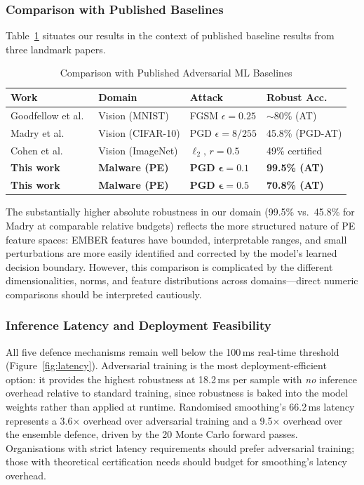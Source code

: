 \documentclass[conference]{IEEEtran}
\begin{document}
\subsubsection{Comparison with Published Baselines}

Table~\ref{tab:baselines} situates our results in the context of published baseline results from three landmark papers.

\begin{table}[htbp]
\centering
\caption{Comparison with Published Adversarial ML Baselines}
\label{tab:baselines}
\setlength{\tabcolsep}{4pt}
\begin{tabular}{p{2.8cm}p{1.3cm}p{1.3cm}p{2.0cm}}
\toprule
\textbf{Work} & \textbf{Domain} & \textbf{Attack} & \textbf{Robust Acc.} \\
\midrule
Goodfellow et al.\ \cite{goodfellow2015} & Vision (MNIST) & FGSM $\epsilon{=}0.25$ & $\sim$80\% (AT) \\
Madry et al.\ \cite{madry2018} & Vision (CIFAR-10) & PGD $\epsilon{=}8/255$ & 45.8\% (PGD-AT) \\
Cohen et al.\ \cite{cohen2019} & Vision (ImageNet) & $\ell_2,\, r{=}0.5$ & 49\% certified \\
\textbf{This work} & \textbf{Malware (PE)} & \textbf{PGD} $\boldsymbol{\epsilon=0.1}$ & \textbf{99.5\% (AT)} \\
\textbf{This work} & \textbf{Malware (PE)} & \textbf{PGD} $\boldsymbol{\epsilon=0.5}$ & \textbf{70.8\% (AT)} \\
\bottomrule
\end{tabular}
\end{table}

The substantially higher absolute robustness in our domain (99.5\% vs.\ 45.8\% for Madry at comparable relative budgets) reflects the more structured nature of PE feature spaces: EMBER features have bounded, interpretable ranges, and small perturbations are more easily identified and corrected by the model's learned decision boundary. However, this comparison is complicated by the different dimensionalities, norms, and feature distributions across domains---direct numeric comparisons should be interpreted cautiously.

\subsubsection{Inference Latency and Deployment Feasibility}

All five defence mechanisms remain well below the 100\,ms real-time threshold (Figure~\ref{fig:latency}). Adversarial training is the most deployment-efficient option: it provides the highest robustness at 18.2\,ms per sample with \emph{no} inference overhead relative to standard training, since robustness is baked into the model weights rather than applied at runtime. Randomised smoothing's 66.2\,ms latency represents a 3.6$\times$ overhead over adversarial training and a 9.5$\times$ overhead over the ensemble defence, driven by the 20 Monte Carlo forward passes. Organisations with strict latency requirements should prefer adversarial training; those with theoretical certification needs should budget for smoothing's latency overhead.
\end{document}
